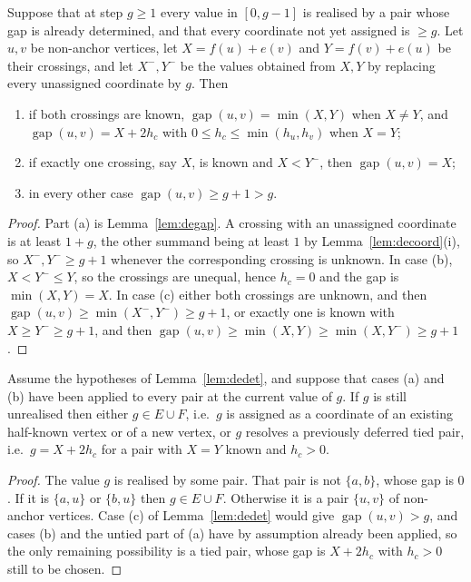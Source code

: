 \begin{lemma}[determination]\label{lem:dedet}
Suppose that at step $g\ge1$ every value in $[0,g-1]$ is realised by a pair
whose gap is already determined, and that every coordinate not yet assigned is
$\ge g$.  Let $u,v$ be non-anchor vertices, let $X=f(u)+e(v)$ and $Y=f(v)+e(u)$
be their crossings, and let $X^-,Y^-$ be the values obtained from $X,Y$ by
replacing every unassigned coordinate by $g$.  Then
\begin{enumerate}
\item[(a)] if both crossings are known, $\operatorname{gap}(u,v)=\min(X,Y)$ when
$X\ne Y$, and $\operatorname{gap}(u,v)=X+2h_c$ with
$0\le h_c\le\min(h_u,h_v)$ when $X=Y$;
\item[(b)] if exactly one crossing, say $X$, is known and $X<Y^-$, then
$\operatorname{gap}(u,v)=X$;
\item[(c)] in every other case $\operatorname{gap}(u,v)\ge g+1>g$.
\end{enumerate}
\end{lemma}

\begin{proof}
Part (a) is Lemma~\ref{lem:degap}.  A crossing with an unassigned coordinate is
at least $1+g$, the other summand being at least $1$ by
Lemma~\ref{lem:decoord}(i), so $X^-,Y^-\ge g+1$ whenever the corresponding
crossing is unknown.  In case (b), $X<Y^-\le Y$, so the crossings are unequal,
hence $h_c=0$ and the gap is $\min(X,Y)=X$.  In case (c) either both crossings
are unknown, and then $\operatorname{gap}(u,v)\ge\min(X^-,Y^-)\ge g+1$, or
exactly one is known with $X\ge Y^-\ge g+1$, and then
$\operatorname{gap}(u,v)\ge\min(X,Y)\ge\min(X,Y^-)\ge g+1$.
\end{proof}

\begin{corollary}\label{cor:debranch}
Assume the hypotheses of Lemma~\ref{lem:dedet}, and suppose that cases (a) and
(b) have been applied to every pair at the current value of $g$.  If $g$ is
still unrealised then either $g\in E\cup F$, i.e.\ $g$ is assigned as a
coordinate of an existing half-known vertex or of a new vertex, or $g$ resolves
a previously deferred tied pair, i.e.\ $g=X+2h_c$ for a pair with $X=Y$ known
and $h_c>0$.
\end{corollary}

\begin{proof}
The value $g$ is realised by some pair.  That pair is not $\{a,b\}$, whose gap
is $0$.  If it is $\{a,u\}$ or $\{b,u\}$ then $g\in E\cup F$.  Otherwise it is a
pair $\{u,v\}$ of non-anchor vertices.  Case (c) of Lemma~\ref{lem:dedet} would
give $\operatorname{gap}(u,v)>g$, and cases (b) and the untied part of (a) have
by assumption already been applied, so the only remaining possibility is a tied
pair, whose gap is $X+2h_c$ with $h_c>0$ still to be chosen.
\end{proof}

